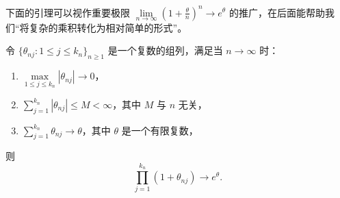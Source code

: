 下面的引理可以视作重要极限 $\lim\limits_{n \to \infty} \left(1 + \tfrac\theta n\right)^n \to e^\theta$ 的推广，在后面能帮助我们``将复杂的乘积转化为相对简单的形式''。

\begin{lemma}

\label{lem:ch3:3-3}

令 $\{ \theta_{nj} : 1 \leq j \leq k_n \}_{n \geq 1}$ 是一个复数的组列，满足当 $n \to \infty$ 时：

\begin{enumerate}
\def\labelenumi{\arabic{enumi}.}
\tightlist
\item
  $\max\limits_{1 \leq j \leq k_n} |\theta_{nj}| \to 0$，
\item
  $\sum\limits_{j=1}^{k_n} |\theta_{nj}| \leq M < \infty$，其中 $M$ 与 $n$ 无关，
\item
  $\sum\limits_{j=1}^{k_n} \theta_{nj} \to \theta$，其中 $\theta$ 是一个有限复数，
\end{enumerate}

则
\[
\prod_{j=1}^{k_n}(1+\theta_{nj})\to e^\theta.
\]

\end{lemma}


